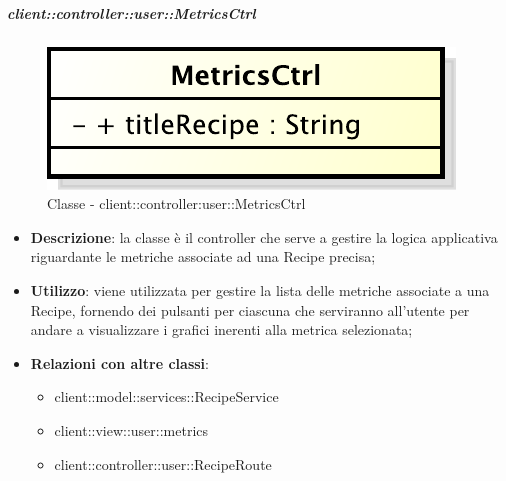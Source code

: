 		\subparagraph{client::controller::user::MetricsCtrl} %
		\label{subp:client_controller_user_metricsctrl}
			\begin{figure}[htbp]
				\centering
				\centerline{\includegraphics[scale=0.7]{./images/client/classes/controller/metrics_ctrl.pdf}}
				\caption{Classe - client::controller:user::MetricsCtrl}
			\end{figure}
			\begin{itemize}
				\item \textbf{Descrizione}: la classe è il controller che serve a gestire la logica applicativa riguardante le metriche associate ad una Recipe precisa;
				\item \textbf{Utilizzo}: viene utilizzata per gestire la lista delle metriche associate a una Recipe, fornendo dei pulsanti per ciascuna che serviranno all'utente per andare a visualizzare i grafici inerenti alla metrica selezionata;
				\item \textbf{Relazioni con altre classi}:
					\begin{itemize}
						\item client::model::services::RecipeService
						\item client::view::user::metrics
						\item client::controller::user::RecipeRoute
					\end{itemize}


\end{itemize}
